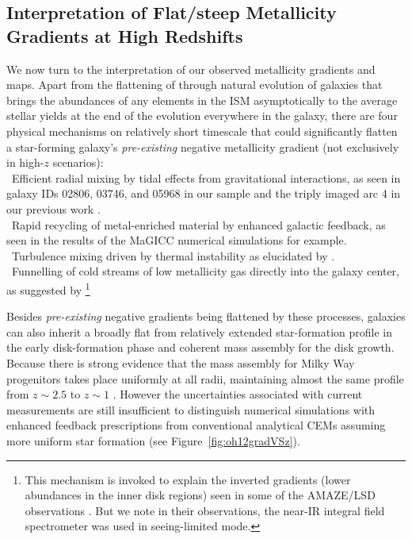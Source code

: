 \subsection{Interpretation of Flat/steep Metallicity Gradients at High Redshifts}

We now turn to the interpretation of our observed metallicity gradients and maps.
Apart from the flattening of \mgs through natural evolution of galaxies that brings the abundances of any elements in the ISM 
asymptotically to the average stellar yields at the end of the evolution everywhere in the galaxy,
there are four physical mechanisms on relatively short timescale that could significantly flatten a star-forming galaxy's 
\emph{pre-existing} negative metallicity gradient (not exclusively in high-$z$ scenarios):\\
\indent\textbullet~Efficient radial mixing by tidal effects from gravitational
interactions, as seen in galaxy IDs 02806, 03746, and 05968 in our sample and the triply
imaged arc 4 in our previous work \citep{2015AJ....149..107J}.\\
\indent\textbullet~Rapid recycling of metal-enriched material by enhanced galactic
feedback, as seen in the results of the MaGICC numerical simulations for example.\\
\indent\textbullet~Turbulence mixing driven by thermal instability as elucidated by
\citet{Yang:2012ia}.\\
\indent\textbullet~Funnelling of cold streams of low metallicity gas directly into the galaxy
center, as suggested by \citet{Dekel:2009fz}\footnote{This mechanism is invoked to
explain the inverted gradients (lower abundances in the inner disk regions) seen in some of
the AMAZE/LSD observations \citep{Cresci:2010hr}. But we note in their observations,
the near-IR integral field spectrometer \sinf was used in seeing-limited mode.}

Besides \emph{pre-existing} negative gradients being flattened by these processes, galaxies
can also inherit a broadly flat \mg from relatively extended star-formation profile in the
early disk-formation phase and coherent mass assembly for the disk growth. Because there is
strong evidence that the mass assembly for Milky Way progenitors takes place uniformly at all
radii, maintaining almost the same \Mstar profile from $z\sim2.5$ to $z\sim1$
\citep{vanDokkum:2013fg,Morishita:2015cz}. However the uncertainties associated with current
measurements are still insufficient to distinguish numerical simulations with enhanced
feedback prescriptions from conventional analytical CEMs assuming more
uniform star formation (see Figure~\ref{fig:oh12gradVSz}).

